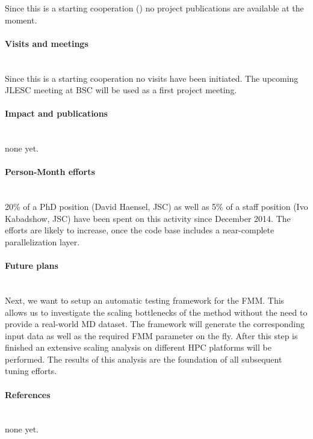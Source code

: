\begin{refsection}[refs_ik]
Since this is a starting cooperation (\starting) no project publications are available at the moment.
\paragraph{Visits and meetings}~\\

Since this is a starting cooperation no visits have been initiated. The upcoming JLESC meeting at BSC will be used as a first project meeting.

\paragraph{Impact and publications}~\\

none yet.

\paragraph{Person-Month efforts}~\\

20\% of a PhD position (David Haensel, JSC) as well as 5\% of a staff position (Ivo Kabadshow, JSC) have been spent on this activity since December 2014. The efforts are likely to increase, once the code base includes a near-complete parallelization layer.

\paragraph{Future plans}~\\

Next, we want to setup an automatic testing framework for the FMM. This allows us to investigate the scaling bottlenecks of the method without the need to provide a real-world MD dataset. The framework will generate the corresponding input data as well as the required FMM parameter on the fly. After this step is finished an extensive scaling analysis on different HPC platforms will be performed. The results of this analysis are the foundation of all subsequent tuning efforts.


\paragraph{References}~\\

none yet.

\printbibliography[heading=none,notkeyword=own]

\end{refsection}
